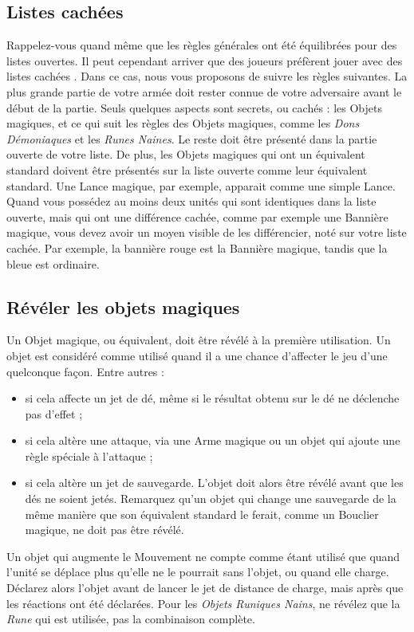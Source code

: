 \subsection*{Listes cachées}
\label{liste_cachee}

Rappelez-vous quand même que les règles générales ont été équilibrées pour des listes ouvertes. Il peut cependant arriver que des joueurs préfèrent jouer avec des listes \og cachées \fg . Dans ce cas, nous vous proposons de suivre les règles suivantes. La plus grande partie de votre armée doit rester connue de votre adversaire avant le début de la partie. Seuls quelques aspects sont secrets, ou \og cachés \fg : les Objets magiques, et ce qui suit les règles des Objets magiques, comme les \emph{Dons Démoniaques} et les \emph{Runes Naines}. Le reste doit être présenté dans la partie ouverte de votre liste. De plus, les Objets magiques qui ont un équivalent standard doivent être présentés sur la liste ouverte comme leur équivalent standard. Une Lance magique, par exemple, apparait comme une simple Lance. Quand vous possédez au moins deux unités qui sont identiques dans la liste ouverte, mais qui ont une différence cachée, comme par exemple une Bannière magique, vous devez avoir un moyen visible de les différencier, noté sur votre liste cachée. Par exemple, la bannière rouge est la Bannière magique, tandis que la bleue est ordinaire.

\subsection*{Révéler les objets magiques}

Un Objet magique, ou équivalent, doit être révélé à la première utilisation. Un objet est considéré comme utilisé quand il a une chance d'affecter le jeu d'une quelconque façon. Entre autres :
\begin{itemize}[label={-}]
\item si cela affecte un jet de dé, même si le résultat obtenu sur le dé ne déclenche pas d'effet ;
\item si cela altère une attaque, via une Arme magique ou un objet qui ajoute une règle spéciale à l'attaque ;
\item si cela altère un jet de sauvegarde. L'objet doit alors être révélé avant que les dés ne soient jetés. Remarquez qu'un objet qui change une sauvegarde de la même manière que son équivalent standard le ferait, comme un Bouclier magique, ne doit pas être révélé.
\end{itemize}

Un objet qui augmente le Mouvement ne compte comme étant utilisé que quand l'unité se déplace plus qu'elle ne le pourrait sans l'objet, ou quand elle charge. Déclarez alors l'objet avant de lancer le jet de distance de charge, mais après que les réactions ont été déclarées. Pour les \emph{Objets Runiques Nains}, ne révélez que la \emph{Rune} qui est utilisée, pas la combinaison complète.

